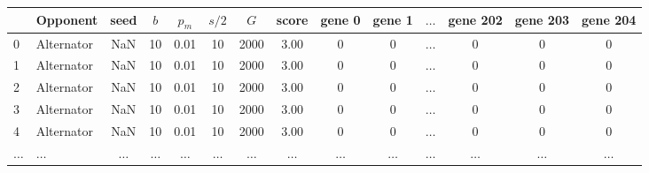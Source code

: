 \begin{tabular}{llcccccccccccc}
\toprule
{} &    Opponent &  seed &  \(b\) &  \(p_m\) &  \(s / 2\) &  \(G\) &   score &  gene 0 &  gene 1 &  \(\dots\) & gene 202 &  gene 203 &  gene 204 \\
\midrule
0 &  Alternator &   NaN &   10 &                  0.01 &                    10 &        2000 &   3.00 &       0 &       0 &  \(\dots\)    & 0 &         0 &         0 \\
1 &  Alternator &   NaN &   10 &                  0.01 &                    10 &        2000 &   3.00 &       0 &       0 &  \(\dots\)    & 0 &         0 &         0 \\
2 &  Alternator &   NaN &   10 &                  0.01 &                    10 &        2000 &   3.00 &       0 &       0 &  \(\dots\)    & 0 &         0 &         0 \\
3 &  Alternator &   NaN &   10 &                  0.01 &                    10 &        2000 &   3.00 &       0 &       0 &  \(\dots\)    & 0 &         0 &         0 \\
4 &  Alternator &   NaN &   10 &                  0.01 &                    10 &        2000 &   3.00 &       0 &       0 &  \(\dots\)    & 0 &         0 &         0 \\
\(\dots\)  &  \(\dots\)  &   \(\dots\)  &   \(\dots\)  & \(\dots\)  &  \(\dots\)  & \(\dots\)  &   \(\dots\)  &       \(\dots\)  &       \(\dots\)  &  \(\dots\)    & \(\dots\)  &         \(\dots\)  &         \(\dots\)  \\
\bottomrule
\end{tabular}
